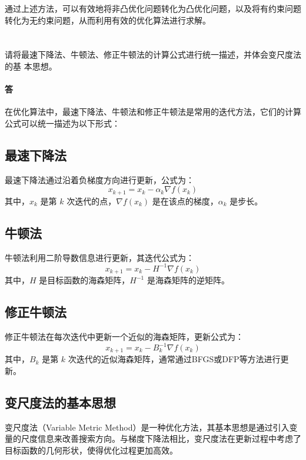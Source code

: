\documentclass[a4paper]{article}
\begin{document}
通过上述方法，可以有效地将非凸优化问题转化为凸优化问题，以及将有约束问题转化为无约束问题，从而利用有效的优化算法进行求解。

\section{}

请将最速下降法、牛顿法、修正牛顿法的计算公式进行统一描述，并体会变尺度法的基
本思想。 

\paragraph{答}

在优化算法中，最速下降法、牛顿法和修正牛顿法是常用的迭代方法，它们的计算公式可以统一描述为以下形式：

\subsection{最速下降法}

最速下降法通过沿着负梯度方向进行更新，公式为：
\[
x_{k+1} = x_k - \alpha_k \nabla f(x_k)
\]
其中，$x_k$ 是第 $k$ 次迭代的点，$\nabla f(x_k)$ 是在该点的梯度，$\alpha_k$ 是步长。

\subsection{牛顿法}

牛顿法利用二阶导数信息进行更新，其迭代公式为：
\[
x_{k+1} = x_k - H^{-1} \nabla f(x_k)
\]
其中，$H$ 是目标函数的海森矩阵，$H^{-1}$ 是海森矩阵的逆矩阵。

\subsection{修正牛顿法}

修正牛顿法在每次迭代中更新一个近似的海森矩阵，更新公式为：
\[
x_{k+1} = x_k - B_k^{-1} \nabla f(x_k)
\]
其中，$B_k$ 是第 $k$ 次迭代的近似海森矩阵，通常通过BFGS或DFP等方法进行更新。

\subsection{变尺度法的基本思想}

变尺度法（Variable Metric Method）是一种优化方法，其基本思想是通过引入变量的尺度信息来改善搜索方向。与梯度下降法相比，变尺度法在更新过程中考虑了目标函数的几何形状，使得优化过程更加高效。
\end{document}
